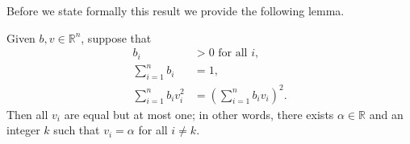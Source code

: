 Before we state formally this result we provide the following lemma.
\begin{lemma}\label{Davids_lemma}
	Given $b,v \in \mathbb{R}^{n}$, suppose that
    \begin{subequations}\label{eq:DavidsLemma}
    		\begin{align}
    			b_i & > 0 \mbox{ for all } i, \label{eq:DavidsLemma_a} \\
    			\sum_{i=1}^n b_i & = 1, \label{eq:DavidsLemma_b} \\
    			\sum_{i=1}^n b_i v_i^2 & = \left(\sum_{i=1}^n b_i v_i \right)^2. \label{eq:DavidsLemma_c}
    		\end{align}
    	\end{subequations}
    	Then all $v_i$ are equal but at most one; in other words, there exists $\alpha \in \mathbb{R}$ and an integer $k$ such that $v_i = \alpha$ for all $i \ne k$.
\end{lemma}
